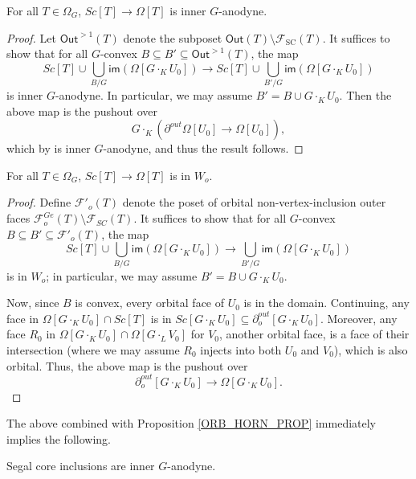 \documentclass[a4paper,10p,draft]{article}%
\numberwithin{equation}{section}%
\begin{document}
\begin{proposition}
      \label{SC_IN_GHORN_PROP}
      For all $T \in \Omega_G$, $Sc[T] \to \Omega[T]$ is inner $G$-anodyne.
\end{proposition}
\begin{proof}
      Let $\mathsf{Out}^{>1}(T)$ denote the subposet $\mathsf{Out}(T) \setminus \mathscr{F}_{\mathrm{SC}}(T)$.
      It suffices to show that for all $G$-convex $B \subseteq B' \subseteq \mathsf{Out}^{>1}(T)$, the map
      \begin{equation}
            Sc[T] \cup \mathop{\bigcup}\limits_{B/G}\mathsf{im}(\Omega[G \cdot_K U_0])
            \to
            Sc[T] \cup \mathop{\bigcup}\limits_{B'/G}\mathsf{im}(\Omega[G \cdot_K U_0])
      \end{equation}
      is inner $G$-anodyne. In particular, we may assume $B' = B \cup G \cdot_K U_0$.
      Then the above map is the pushout over
      \begin{equation}
                  G\cdot_K \left(\partial^{out}\Omega[U_0] \to \Omega[U_0] \right),
      \end{equation}
      which by \cite[Proposition 6.17]{Per17} is inner $G$-anodyne,
      and thus the result follows.
\end{proof}
\begin{proposition}
      \label{SC_IN_OHORN_PROP}
      For all $T \in \Omega_G$, $Sc[T] \to \Omega[T]$ is in $W_o$. 
\end{proposition}
\begin{proof}
      Define $\mathscr{F}'_{o}(T)$ denote the poset of orbital non-vertex-inclusion outer faces
      $\mathscr{F}_{o}^{G e}(T) \setminus \mathscr{F}_{SC}(T)$.
      It suffices to show that for all $G$-convex $B \subseteq B' \subseteq \mathscr{F}'_o(T)$, the map
      \begin{equation}
            Sc[T] \cup \mathop{\bigcup}\limits_{B/G}\mathsf{im}\left(\Omega[G \cdot_K U_0]\right)
            \to
            \mathop{\bigcup}\limits_{B'/G}\mathsf{im}\left(\Omega[G \cdot_K U_0]\right)
      \end{equation}
      is in $W_o$; in particular, we may assume $B' = B \cup G \cdot_K U_0$.

      Now, since $B$ is convex, every orbital face of $U_0$ is in the domain.
      Continuing, any face in $\Omega[G \cdot_K U_0] \cap Sc[T]$ is in $Sc[G \cdot_K U_0] \subseteq \partial^{out}_o[G \cdot_K U_0]$.
      Moreover, any face $R_0$ in $\Omega[G \cdot_K U_0] \cap \Omega[G \cdot_L V_0]$ for $V_0$, another orbital face,
      is a face of their intersection (where we may assume $R_0$ injects into both $U_0$ and $V_0$),
      which is also orbital.
      Thus, the above map is the pushout over
      \begin{equation}
            \partial^{out}_o[G \cdot_K U_0] \to \Omega[G \cdot_K U_0].
      \end{equation}
\end{proof}
The above combined with Proposition \ref{ORB_HORN_PROP} immediately implies the following.
\begin{corollary}
      Segal core inclusions are inner $G$-anodyne.
\end{corollary}
\end{document}
